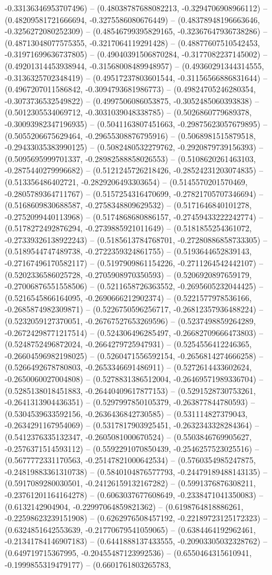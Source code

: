 -0.33136346953707496) -- (0.48038787688082213, -0.3294706908966112) -- (0.48209581721666694, -0.3275586080676449) -- (0.48378948196663646, -0.3256272080252309) -- (0.48546799395829165, -0.32367647936738286) -- (0.48713048077575355, -0.3217064119291428) -- (0.48877607510542453, -0.31971699636737805) -- (0.49040391506870284, -0.3177082237145002) -- (0.49201314453938944, -0.31568008489948957) -- (0.49360291344314555, -0.3136325702348419) -- (0.49517237803601544, -0.31156566886831644) -- (0.4967207011586842, -0.3094793681986773) -- (0.49824705246280354, -0.3073736532549822) -- (0.4997506086053875, -0.3052485060393838) -- (0.5012305534069712, -0.3031039048338785) -- (0.5026860779689378, -0.30093982347196935) -- (0.5041163807451663, -0.29875623057679895) -- (0.5055206675629464, -0.29655308876795916) -- (0.5068981515879518, -0.29433035383990125) -- (0.5082480532279762, -0.2920879739156393) -- (0.5095695999701337, -0.28982588858026553) -- (0.5108620261463103, -0.2875440279996682) -- (0.5121245726218426, -0.28524231203074835) -- (0.513356486402721, -0.2829206493303654) -- (0.5145570201570469, -0.2805789364711767) -- (0.5157254316470699, -0.27821705707346694) -- (0.5168609830688587, -0.2758348809629532) -- (0.5171646840101278, -0.2752099440113968) -- (0.5174868680886157, -0.27459433222242774) -- (0.5178272492876294, -0.2739885921011649) -- (0.5181855254361072, -0.27339326138922243) -- (0.5185613784768701, -0.27280886858733305) -- (0.5189544747489738, -0.2722359324861755) -- (0.5193644652839143, -0.27167496170582117) -- (0.5197909861154226, -0.2711264542442107) -- (0.5202336586025728, -0.2705908970350593) -- (0.5206920897659179, -0.27006876551558506) -- (0.5211658726363552, -0.2695605232044425) -- (0.5216545866164095, -0.2690666212902374) -- (0.5221577978536166, -0.2685874982309871) -- (0.5226750596256717, -0.26812357936488224) -- (0.5232059127370051, -0.26767527653269596) -- (0.5237498859264289, -0.26724298771217514) -- (0.524306496285497, -0.26682709666473803) -- (0.5248752496872024, -0.2664279725947931) -- (0.5254556412246365, -0.26604596982198025) -- (0.5260471556592154, -0.2656814274666258) -- (0.5266492678780803, -0.2653346691486911) -- (0.5272614433602624, -0.2650060027004808) -- (0.5278831386512004, -0.26469571989336704) -- (0.5285138018451883, -0.26440409617877153) -- (0.5291528730753261, -0.2641313904436351) -- (0.5297997850105379, -0.263877844780593) -- (0.5304539633592156, -0.2636436842730585) -- (0.531114827379043, -0.2634291167954069) -- (0.5317817903925451, -0.2632343328284364) -- (0.5412376335132347, -0.2605081000670524) -- (0.5503846769905627, -0.2576371514593112) -- (0.5592291070850439, -0.2546257523025516) -- (0.5677772331170563, -0.25147821000642534) -- (0.5760354985247875, -0.24819883361310738) -- (0.5840104876577793, -0.24479189488143135) -- (0.5917089280030501, -0.24126159132167282) -- (0.5991376876308211, -0.23761201164164278) -- (0.6063037677608649, -0.2338471041350083) -- (0.6132142904904, -0.22997064859821362) -- (0.6198764818886261, -0.22598623239151908) -- (0.6262976508457192, -0.22189723125172323) -- (0.6324851642553639, -0.21770679541059065) -- (0.6384464192962461, -0.21341784146907183) -- (0.6441888137433555, -0.20903305032328762) -- (0.649719715367995, -0.20455487123992536) -- (0.6550464315610941, -0.1999855319479177) -- (0.6601761803265783, 
